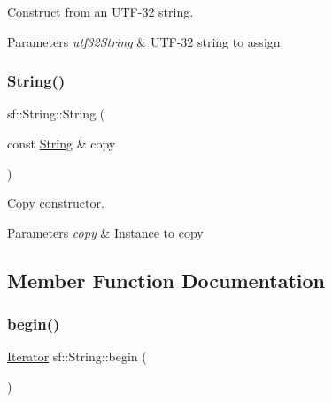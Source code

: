 Construct from an U\+T\+F-\/32 string. 


\begin{DoxyParams}{Parameters}
{\em utf32\+String} & U\+T\+F-\/32 string to assign \\
\hline
\end{DoxyParams}
\mbox{\label{classsf_1_1_string_af862594d3c4070d8ddbf08cf8dce4f59}} 
\subsubsection{\texorpdfstring{String()}{String()}\hspace{0.1cm}{\footnotesize\ttfamily [11/11]}}
{\footnotesize\ttfamily sf\+::\+String\+::\+String (\begin{DoxyParamCaption}\item[{const \hyperlink{classsf_1_1_string}{String} \&}]{copy }\end{DoxyParamCaption})}



Copy constructor. 


\begin{DoxyParams}{Parameters}
{\em copy} & Instance to copy \\
\hline
\end{DoxyParams}


\subsection{Member Function Documentation}
\mbox{\label{classsf_1_1_string_a8ec30ddc08e3a6bd11c99aed782f6dfe}} 
\subsubsection{\texorpdfstring{begin()}{begin()}\hspace{0.1cm}{\footnotesize\ttfamily [1/2]}}
{\footnotesize\ttfamily \hyperlink{classsf_1_1_string_ac90f2b7b28f703020f8d027e98806235}{Iterator} sf\+::\+String\+::begin (\begin{DoxyParamCaption}{ }\end{DoxyParamCaption})}



